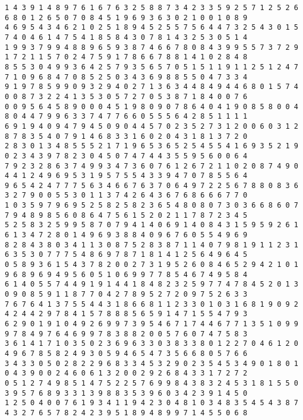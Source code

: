 \begin{verbatim}
1 4 3 9 1 4 8 9 7 6 1 6 7 6 3 2 5 8 8 7 3 4 2 3 3 5 9 2 5 7 1 2 5 2 6 6 8 0 1 2 6 5 0 7 0 8 4 5 1 9 6 9 3 6 3 0 2 1 0 0 1 0 8 9
4 6 9 5 4 3 4 6 2 1 0 2 5 1 8 9 4 5 2 5 5 7 5 6 4 4 7 3 2 5 4 3 0 1 5 7 4 0 4 6 1 4 7 5 4 1 8 5 8 4 3 0 7 8 1 4 3 2 5 3 0 5 1 4
1 9 9 3 7 9 9 4 8 8 9 6 5 9 3 8 7 4 6 6 7 8 0 8 4 3 9 9 5 5 7 3 7 2 9 1 7 2 1 1 5 7 0 2 4 7 5 9 1 7 8 6 6 7 8 8 1 4 1 0 2 8 4 8
8 5 5 3 0 4 9 9 3 6 4 2 5 7 9 3 5 6 5 7 0 5 1 5 1 1 9 1 1 2 5 1 2 4 7 7 1 0 9 6 8 4 7 0 8 5 2 5 0 3 4 3 6 9 8 8 5 5 0 4 7 3 3 4
9 1 9 7 8 5 9 9 0 9 3 2 9 4 0 2 7 1 3 6 3 4 4 8 4 9 4 4 6 8 0 1 5 7 4 0 0 8 7 3 2 2 4 1 3 5 3 0 5 7 2 7 0 5 3 8 7 1 8 4 0 0 7 6
0 0 9 5 6 4 5 8 9 0 0 0 4 5 1 9 8 0 9 0 7 8 6 4 0 4 1 9 0 8 5 8 0 0 4 8 0 4 4 7 9 9 6 3 3 7 4 7 7 6 6 0 5 5 5 6 4 2 8 5 1 1 1 1
6 9 1 9 4 0 9 4 7 9 4 5 0 9 0 4 4 5 7 0 2 3 5 2 7 3 1 2 0 0 6 0 3 1 2 8 7 8 3 5 4 0 7 9 1 4 6 8 3 3 1 6 0 2 0 4 3 1 8 1 3 7 2 0
2 8 3 0 1 3 4 8 5 5 5 2 1 7 1 9 6 5 3 6 5 2 5 4 5 5 4 1 6 9 3 5 2 1 9 0 2 3 4 3 9 7 8 2 3 0 4 5 0 7 4 7 4 4 3 5 5 9 5 6 0 0 6 4
7 9 2 3 2 8 6 3 7 4 9 9 3 4 7 3 6 0 7 6 1 2 6 7 2 1 1 0 2 0 8 7 4 9 0 4 4 1 2 4 9 6 9 5 3 1 9 5 7 5 5 4 3 3 9 4 7 0 7 8 5 5 6 4
9 6 5 4 2 4 7 7 7 5 6 3 4 6 6 7 6 3 7 0 6 4 9 7 2 2 5 6 7 8 8 0 8 3 6 3 2 7 9 0 0 5 5 3 0 1 1 3 7 4 2 6 4 3 6 7 6 8 6 6 6 7 7 0
1 0 3 5 9 7 9 6 9 5 2 5 8 2 5 8 2 3 6 5 4 8 0 8 0 7 3 0 3 6 6 8 6 0 7 7 9 4 8 9 8 5 6 0 8 6 4 7 5 6 1 5 2 0 2 1 1 7 8 7 2 3 4 5
5 2 5 8 3 2 5 9 9 5 8 7 0 7 9 4 1 4 0 6 9 1 4 0 8 4 3 1 5 9 5 9 2 6 1 6 1 3 4 7 2 8 0 1 4 9 6 9 3 8 8 4 0 9 6 7 6 0 5 5 4 9 6 9
8 2 8 4 3 8 0 3 4 1 1 3 0 8 7 5 2 8 3 8 7 1 1 4 0 7 9 8 1 9 1 1 2 3 1 6 3 5 3 0 7 7 7 5 4 8 6 9 7 8 7 1 8 1 4 1 2 5 6 4 9 6 4 5
0 5 8 9 3 6 1 5 4 3 7 8 2 0 0 2 7 3 1 9 5 2 6 0 8 4 6 5 2 9 4 2 1 0 1 9 6 8 9 6 9 4 9 5 6 0 5 1 0 6 9 9 7 7 8 5 4 6 7 4 9 5 8 4
6 1 4 0 5 5 7 4 4 9 1 9 1 4 4 1 8 4 8 2 3 2 5 9 7 7 4 7 8 4 5 2 0 1 3 0 9 0 8 5 9 1 1 8 7 7 0 4 2 7 8 9 5 2 7 2 0 9 7 5 2 6 3 3
7 6 7 6 4 1 3 7 5 5 4 4 3 1 8 6 6 8 1 1 2 3 3 0 1 0 3 1 6 8 1 9 0 9 2 4 2 4 4 2 9 7 8 4 1 5 7 8 8 8 5 6 5 9 1 4 7 1 5 5 4 7 9 3
6 2 9 0 1 9 1 0 4 9 2 6 9 9 7 3 9 5 4 6 7 1 7 4 4 6 7 7 1 3 5 1 0 9 9 9 7 8 4 9 7 6 4 6 9 9 7 8 3 8 8 2 0 0 5 7 6 0 7 4 7 5 8 3
3 6 1 4 1 7 1 0 3 5 0 2 3 6 9 6 3 3 0 3 8 3 3 8 0 1 2 2 7 0 4 6 1 2 0 4 9 6 7 8 5 8 2 4 9 3 0 5 9 4 6 5 4 7 3 5 6 6 8 0 5 7 6 6
3 4 3 3 0 5 0 2 8 2 2 9 6 8 3 3 4 5 3 2 9 0 2 3 5 4 5 3 4 9 0 1 8 0 1 0 4 3 9 0 0 2 4 6 0 6 1 3 2 0 0 2 9 2 6 8 4 3 3 1 7 2 7 2
0 5 1 2 7 4 9 8 5 1 4 7 5 2 2 5 7 6 9 9 8 4 3 8 3 2 4 5 3 1 8 1 5 5 0 3 9 5 7 6 8 9 3 3 1 3 9 8 8 3 5 3 9 6 0 3 4 2 3 9 1 4 5 0
1 2 5 0 4 0 0 7 6 1 9 3 4 1 1 9 4 2 3 0 4 8 1 0 3 4 8 3 5 4 5 4 3 8 7 4 3 2 7 6 5 7 8 2 4 2 3 9 5 1 8 9 4 8 9 9 7 1 4 5 5 0 6 8

\end{verbatim}
